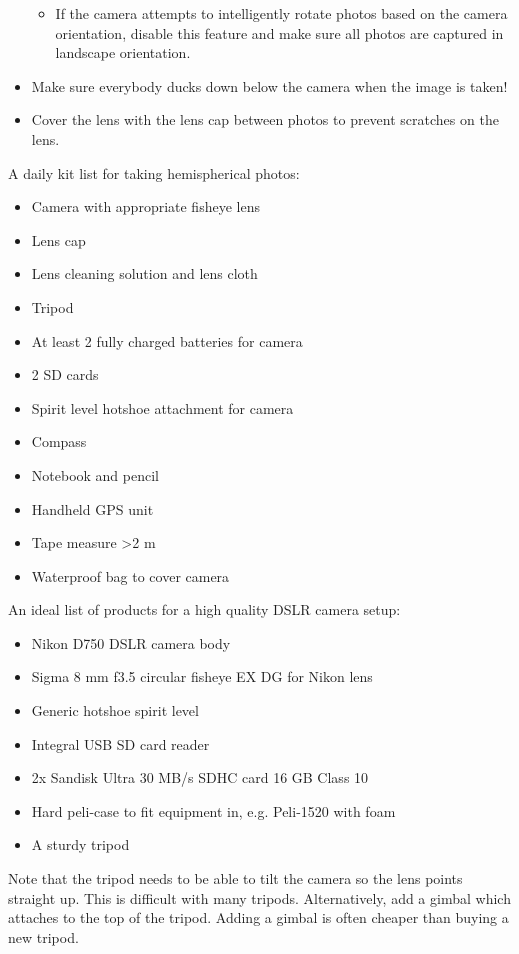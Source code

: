 \documentclass[11pt,a4paper]{article}
\begin{document}
\begin{itemize}
\begin{itemize}
			\item{If the camera attempts to intelligently rotate photos based on the camera orientation, disable this feature and make sure all photos are captured in landscape orientation.}
		\end{itemize}
	\item{Make sure everybody ducks down below the camera when the image is taken!}
	\item{Cover the lens with the lens cap between photos to prevent scratches on the lens.}
\end{itemize}

A daily kit list for taking hemispherical photos:

\begin{itemize}
	\item{Camera with appropriate fisheye lens}
	\item{Lens cap}
	\item{Lens cleaning solution and lens cloth}
	\item{Tripod}
	\item{At least 2 fully charged batteries for camera}
	\item{2 SD cards}
	\item{Spirit level hotshoe attachment for camera}
	\item{Compass}
	\item{Notebook and pencil}
	\item{Handheld GPS unit}
	\item{Tape measure >2 m}
	\item{Waterproof bag to cover camera}
\end{itemize}

An ideal list of products for a high quality DSLR camera setup:

\begin{itemize}
	\item{Nikon D750 DSLR camera body}
	\item{Sigma 8 mm f3.5 circular fisheye EX DG for Nikon lens}
	\item{Generic hotshoe spirit level}
	\item{Integral USB SD card reader}
	\item{2x Sandisk Ultra 30 MB/s SDHC card 16 GB Class 10}
	\item{Hard peli-case to fit equipment in, e.g. Peli-1520 with foam}
	\item{A sturdy tripod}
\end{itemize}

Note that the tripod needs to be able to tilt the camera so the lens points straight up. This is difficult with many tripods. Alternatively, add a gimbal which attaches to the top of the tripod. Adding a gimbal is often cheaper than buying a new tripod.
\end{document}

